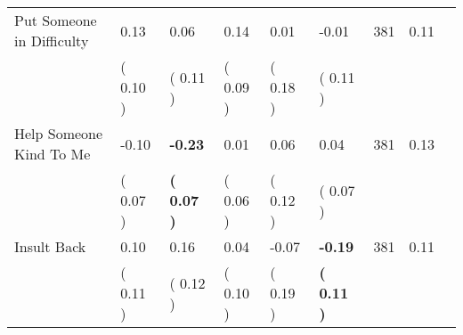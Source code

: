 \begin{tabular}{L{6.2cm} C{1.8cm} C{1.8cm} C{1.8cm} C{1.8cm} C{1.8cm} C{1.8cm} C{0.3cm} C{0.3cm}}
Put Someone in Difficulty &      0.13 &      0.06 &      0.14 &      0.01 &     -0.01  & 381 &       0.11 \\ 
 & (     0.10 ) & (     0.11 ) & (     0.09 ) & (     0.18 ) & (     0.11 )  & \\
Help Someone Kind To Me &     -0.10 & \textbf{    -0.23} &      0.01 &      0.06 &      0.04  & 381 &       0.13 \\ 
 & (     0.07 ) & \textbf{(     0.07 )} & (     0.06 ) & (     0.12 ) & (     0.07 )  & \\
Insult Back &      0.10 &      0.16 &      0.04 &     -0.07 & \textbf{    -0.19}  & 381 &       0.11 \\ 
 & (     0.11 ) & (     0.12 ) & (     0.10 ) & (     0.19 ) & \textbf{(     0.11 )}  & \\
\bottomrule
\end{tabular}
